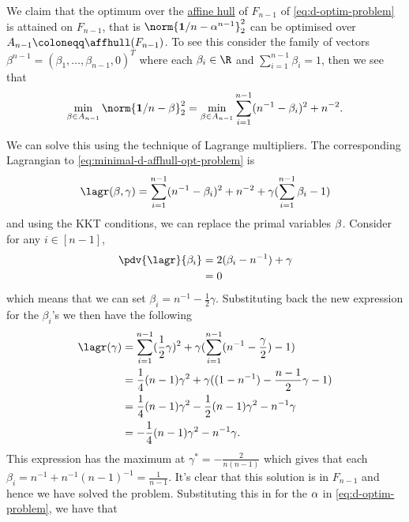 We claim that the optimum over the \hyperref[def:aff-hull]{affine hull} of \(F_{n-1}\) of
\ref{eq:d-optim-problem} is attained on \(F_{n-1}\), that is
\(\norm{\mathbf{1}/n - \alpha^{n-1}}_{2}^{2}\) can be optimised over \(A_{n-1}
\coloneqq \affhull(F_{n-1})\). To see this consider the family of vectors
\(\beta^{n-1} = (\beta_{1}, \dots, \beta_{n-1}, 0)^{T}\) where each \(\beta_{i}
\in \R\) and \(\sum_{i=1}^{n-1}\beta_{i} = 1\), then we see that
\begin{equation}
  \label{eq:minimal-d-affhull-opt-problem}
  \min_{\mat{\beta} \in A_{n-1}}\norm{\mathbf{1}/n - \mat{\beta}}^{2}_{2} = \min_{\mat{\beta} \in A_{n-1}} \sum_{i=1}^{n-1} (n^{-1} - \beta_{i})^{2} + n^{-2}.
\end{equation}

We can solve this using the technique of Lagrange multipliers. The corresponding
Lagrangian to
\ref{eq:minimal-d-affhull-opt-problem} is
\begin{equation*}
  \lagr(\mat{\beta}, \gamma) = \sum_{i=1}^{n-1} (n^{-1} - \beta_{i})^{2} + n^{-2} + \gamma (\sum_{i=1}^{n-1} \beta_i - 1)
\end{equation*}
and using the KKT conditions, we can replace the primal variables
\(\mathbf{\beta}\). Consider for any \(i \in [n-1]\),
\begin{align*}
  \pdv{\lagr}{\beta_{i}} & = 2(\beta_{i} - n^{-1}) + \gamma \\
                         & = 0
\end{align*}
which means that we can set \(\beta_{i} = n^{-1} - \frac{1}{2}\gamma\).
Substituting back the new expression for the \(\beta_i\)'s we then have the
following
\begin{align*}
  \lagr(\gamma) & = \sum_{i=1}^{n-1} (\frac{1}{2} \gamma)^{2} + \gamma (\sum_{i=1}^{n-1} (n^{-1} - \frac{\gamma}{2}) - 1) \\
                & = \frac{1}{4}(n-1)\gamma^{2} + \gamma((1 - n^{-1}) - \frac{n-1}{2}\gamma - 1) \\
                & = \frac{1}{4}(n-1)\gamma^{2} - \frac{1}{2}(n-1)\gamma^{2} - n^{-1} \gamma \\
                & = -\frac{1}{4}(n-1)\gamma^{2} - n^{-1} \gamma.
\end{align*}
This expression has the maximum at \(\gamma^{\ast} = -\frac{2}{n(n-1)}\) which
gives that each \(\beta_{i} = n^{-1} + n^{-1}(n-1)^{-1} = \frac{1}{n-1}\). It's
clear that this solution is in \(F_{n-1}\) and hence we have solved the problem.
Substituting this in for the \(\mathbf{\alpha}\) in
\ref{eq:d-optim-problem}, we have that
